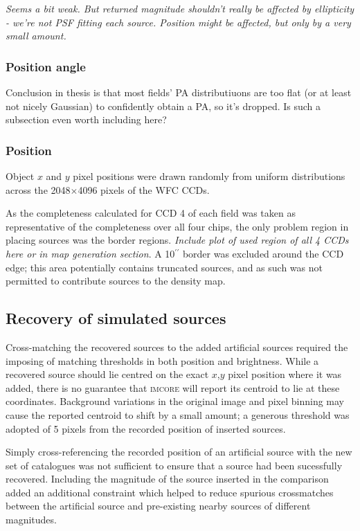 \documentclass[a4paper,useAMS,usenatbib]{mn2e}
\begin{document}
\textit{Seems a bit weak. But returned magnitude shouldn't really be affected by ellipticity - we're not PSF fitting each source. Position might be affected,
but only by a very small amount.}

\subsubsection{Position angle}
\label{subsubsec:potition_angle}
Conclusion in thesis is that most fields' PA distributiuons are too flat (or
at least not nicely Gaussian) to confidently obtain a PA, so it's dropped. Is
such a subsection even worth including here?

\subsubsection{Position}
\label{subsubsec:position}
Object $x$ and $y$ pixel positions were drawn randomly from uniform
distributions across the 2048$\times$4096 pixels of the WFC CCDs.

As the completeness calculated for CCD 4 of each field was taken as representative of the completeness over all four chips, the only problem region
in placing sources was the border regions. \textsl{Include plot of used region
of all 4 CCDs here or in map generation section}. A 10$^{\prime\prime}$ border
was excluded around the CCD edge; this area potentially contains truncated
sources, and as such was not permitted to contribute sources to the density map.

\subsection{Recovery of simulated sources}
\label{subsec:recovery}

Cross-matching the recovered sources to the added artificial sources required the imposing of matching thresholds in both position and brightness. While a recovered source should lie centred on the exact $x$,$y$ pixel position where it was added, there is no guarantee that \textsc{imcore} will report its centroid to lie at these coordinates. Background variations in the original image and pixel binning may cause the reported centroid to shift by a small amount; a generous threshold was adopted of 5 pixels from the recorded position of inserted sources.

Simply cross-referencing the recorded position of an artificial source with
the new set of catalogues was not sufficient to ensure that a source had been
sucessfully recovered. Including the magnitude of the source inserted in the
comparison added an additional constraint which helped to reduce spurious
crossmatches between the artificial source and pre-existing nearby sources of
different magnitudes.
\end{document}
